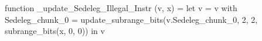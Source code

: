 function _update_Sedeleg_Illegal_Instr (v, x) = let v = { v with Sedeleg_chunk_0 = update_subrange_bits(v.Sedeleg_chunk_0, 2, 2, subrange_bits(x, 0, 0)) } in
  v
